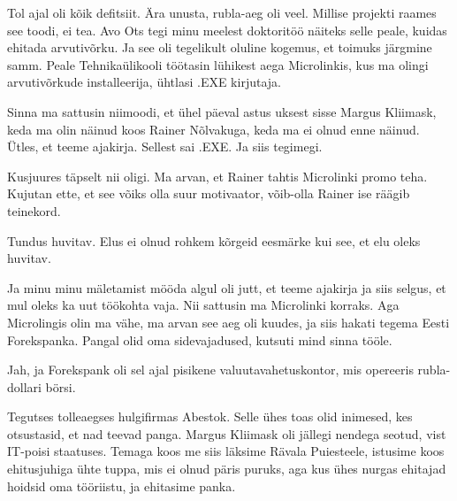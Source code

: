 
Tol ajal oli kõik defitsiit. Ära unusta, rubla-aeg oli veel. Millise projekti 
raames see toodi, ei tea. Avo Ots tegi minu meelest 
doktoritöö näiteks selle peale, kuidas ehitada arvutivõrku. Ja see oli 
tegelikult oluline kogemus, et toimuks järgmine samm. Peale Tehnikaülikooli 
töötasin lühikest aega Microlinkis, kus ma olingi 
arvutivõrkude installeerija, ühtlasi .EXE kirjutaja.


Sinna ma sattusin niimoodi, et ühel päeval astus uksest sisse Margus 
Kliimask, keda ma olin näinud koos Rainer 
Nõlvakuga, keda ma ei olnud enne näinud. Ütles, et 
teeme ajakirja. Sellest sai .EXE. Ja siis tegimegi.


Kusjuures täpselt nii oligi. Ma arvan, et Rainer tahtis Microlinki promo teha. 
Kujutan ette, et see võiks olla suur motivaator, võib-olla Rainer ise räägib 
teinekord.


Tundus huvitav. Elus ei olnud rohkem kõrgeid eesmärke kui see, et elu oleks 
huvitav.


Ja minu minu mäletamist mööda algul oli jutt, et teeme ajakirja ja siis selgus, 
et mul oleks ka uut töökohta vaja. Nii sattusin ma Microlinki 
korraks. Aga Microlingis olin ma vähe, ma arvan see aeg oli kuudes, ja 
siis hakati tegema Eesti Forekspanka. Pangal olid oma sidevajadused, kutsuti mind sinna tööle.


Jah, ja Forekspank oli sel ajal pisikene valuutavahetuskontor, mis opereeris 
rubla-dollari börsi.

Tegutses tolleaegses hulgifirmas Abestok. Selle  ühes toas olid 
inimesed, kes otsustasid, et nad teevad panga. Margus 
Kliimask oli jällegi nendega seotud, vist IT-poisi 
staatuses. Temaga koos me siis läksime Rävala Puiesteele, istusime koos 
ehitusjuhiga ühte tuppa, mis ei olnud päris puruks, aga kus ühes nurgas 
ehitajad hoidsid oma tööriistu, ja ehitasime panka.

